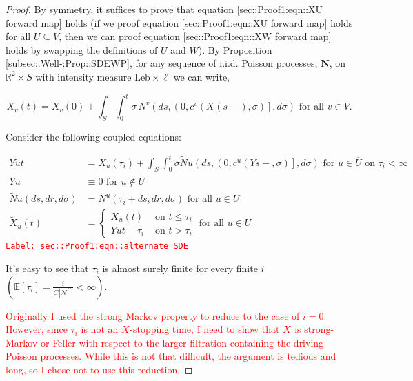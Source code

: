 \documentclass[12pt]{article}
\newcommand{\mb}{\mathbb}
\newcommand{\mc}{\mathcal}
\newcommand{\ov}{\overline}
\newcommand{\te}{\text}
\newcommand{\tr}{\textcolor{red}}
\newcommand{\labe}[1]{\tr{\texttt{Label: #1}}}
\newcommand{\ind}{\hspace{24pt}}
\newcommand{\ex}[1]{\mb{E}\left[#1\right]}			%
\renewcommand{\v}{v}							%
\newcommand{\vv}{u}								%
\renewcommand{\U}{U}							%
\newcommand{\UU}{W}								%
\renewcommand{\S}{S}							%
\newcommand{\s}{\sigma}							%
\renewcommand{\t}{t}							%
\renewcommand{\tt}{s}							%
\newcommand{\X}{X}								%
\newcommand{\IGr}{c}							%
\newcommand{\neigh}{\mc{N}}						%
\newcommand{\vind}[1]{^{#1}}					%
\newcommand{\cind}[1]{_{#1}}					%
\newcommand{\cl}{\ov}							%
\newcommand{\tp}[1]{(#1)}						%
\newcommand{\tip}[1]{#1}						%
\newcommand{\const}{C}							%
\newcommand{\poisses}{\mathbf{N}}				%
\newcommand{\poiss}{N}							%
\newcommand{\leb}{\te{Leb}}						%
\newcommand{\Sm}{\ell}							%
\renewcommand{\r}{r}							%
\newcommand{\alt}[1]{\widetilde{#1}}			%
\newcommand{\indx}[1]{_{#1}}					%
\newcommand{\XX}{Y}								%
\newcommand{\rt}{\tau}							%
\begin{document}
\begin{proof}
By symmetry, it suffices to prove that equation \ref{sec::Proof1:eqn::XU forward map} holds (if we proof equation \eqref{sec::Proof1:eqn::XU forward map} holds for all \(\U \subseteq V\), then we can proof equation \eqref{sec::Proof1:eqn::XW forward map} holds by swapping the definitions of \(\U\) and \(\UU\)). By Proposition \ref{subsec::Well-:Prop::SDEWP}, for any sequence of i.i.d. Poisson processes, \(\poisses\), on \(\mb{R}^2\times \S\) with intensity measure \(\leb\times\Sm\) we can write,

\[\X\cind{\v}\tp{\t} = \X\cind{\v}\tp{0} + \int_\S\int_0^\t \s\,\poiss\vind{\v}\left(d\tt,\left(0,\IGr\vind{\v}(\X\cind{}\tp{\tt-},\s)\right],d\s\right)\te{ for all } \v\in V.\]

Consider the following coupled equations:

\begin{align}
\XX{\vv}{\t} &= \X\cind{\vv}\tp{\rt\indx{i}} + \int_\S\int_0^\t \s\alt{\poiss}{\vv}\left(d\tt,\left(0,\IGr\vind{\vv}(\XX{}{\tt-},\s)\right],d\s\right)\te{ for } \vv \in \cl{\U} \te{ on } \rt\indx{i} < \infty \label{sec::Proof1:eqn::alternate SDE}\\
\XX{\vv}{} &\equiv 0\te{ for } \vv\notin \cl{\U}\nonumber\\
\alt{\poiss}{\vv}(d\tt,d\r,d\s) &= \poiss\vind{\vv}(\rt\indx{i} + d\tt,d\r,d\s) \te{ for all }\vv\in \cl{\U}\nonumber\\
\alt{\X}\cind{\vv}\tp{\t} &= \begin{cases}
\X\cind{\vv}\tp{\t} &\te{ on } \t \leq \rt\indx{i}\\
\XX{\vv}{\t - \rt\indx{i}} &\te{ on } \t > \rt\indx{i}
\end{cases} \te{ for all } \vv\in \cl{\U} \nonumber
\end{align}
\labe{sec::Proof1:eqn::alternate SDE}

It's easy to see that \(\rt\indx{i}\) is almost surely finite for every finite \(i\) \(\left(\ex{\rt\indx{i}} = \frac{i}{\const\indx{}|\neigh\vind{\U}|} < \infty\right)\). 

\ind \tr{Originally I used the strong Markov property to reduce to the case of \(i = 0\). However, since \(\rt\indx{i}\) is not an \(\X\cind{}\tip{}\)-stopping time, I need to show that \(\X\cind{}\tip{}\) is strong-Markov or Feller with respect to the larger filtration containing the driving Poisson processes. While this is not that difficult, the argument is tedious and long, so I chose not to use this reduction.}


\end{proof}
\end{document}
